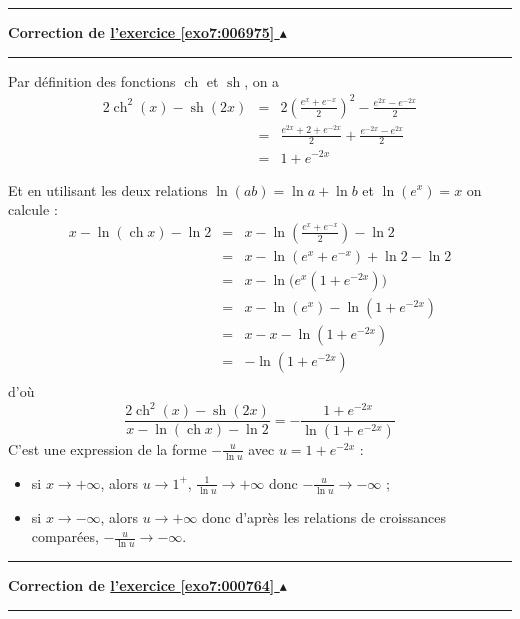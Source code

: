 \documentclass[11pt,a4paper]{article}
\newcommand{\ch}{\mathop{\mathrm{ch}}\nolimits}
\newcommand{\sh}{\mathop{\mathrm{sh}}\nolimits}
\newcounter{exo}
\newcommand{\correction}[1]{\hypertarget{cor7:#1}{}\label{cor7:#1}{\bf Correction de \hyperlink{exo7:#1}{l'exercice \ref{exo7:#1} $\blacktriangle$}}\vspace{1mm}\hrule\vspace{1mm}}
\newcommand{\fincorrection}{\vspace{1mm}\hrule\vspace*{7mm}}
\begin{document}
\fincorrection
\correction{006975}
Par définition des fonctions $\ch$ et $\sh$, on a 
\begin{eqnarray*}
2\ch^2(x)-\sh(2x)&=&2\left(\frac{e^x+e^{-x}}{2}\right)^2-\frac{e^{2x}-e^{-2x}}{2}\\
 &=&\frac{e^{2x}+2+e^{-2x}}{2}+\frac{e^{-2x}-e^{2x}}{2}\\
 &=&1+e^{-2x}
\end{eqnarray*}

Et en utilisant les deux relations $\ln(ab)=\ln a + \ln b$ et $\ln(e^x) = x$ on calcule :
\begin{eqnarray*}
x-\ln(\ch x)-\ln 2
  &=& x-\ln\left(\frac{e^x+e^{-x}}{2}\right)-\ln 2\\
  &=& x-\ln(e^x+e^{-x}) + \ln 2 - \ln 2\\
  &=& x-\ln\big(e^x(1+e^{-2x})\big)\\
  &=& x-\ln(e^x)-\ln(1+e^{-2x})\\
  &=& x-x-\ln(1+e^{-2x})\\
  &=& -\ln(1+e^{-2x})\\
\end{eqnarray*}
d'où 
$$\frac{2\ch^2(x)-\sh(2x)}{x-\ln(\ch x)-\ln 2}=-\frac{1+e^{-2x}}{\ln(1+e^{-2x})}$$
C'est une expression de la forme $-\frac{u}{\ln u}$ avec $u=1+e^{-2x}$ :
\begin{itemize}
  \item si $x\to +\infty$, alors $u\to 1^+$, $\frac{1}{\ln u} \to +\infty$ 
  donc $-\frac{u}{\ln u}\to -\infty$ ;
  \item si $x\to -\infty$, alors $u\to +\infty$ donc d'après les 
  relations de croissances comparées, $-\frac{u}{\ln u}\to -\infty$.
\end{itemize}
\fincorrection
\correction{000764}\
\end{document}
